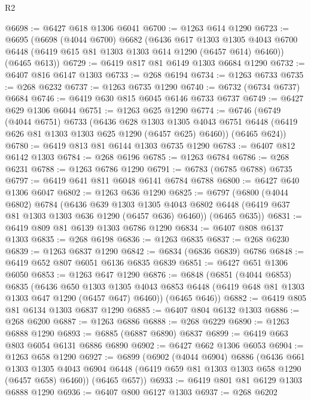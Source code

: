 \begin{lexlean}{R2}
\begin{coremodule}
@6698 := @6427 @618 @1306 @6041
@6700 := @1263 @614 @1290
@6723 := @6695
    (@6698
      (@4044 @6700)
      @6682
      (@6436
        @617
        @1303
        @1305
        @4043
        @6700
        @6448
        (@6419 @615 @81 @1303 @1303 @614 @1290 (@6457 @614) @6460))
      (@6465 @613))
@6729 := @6419 @817 @81 @6149 @1303 @6684 @1290
@6732 := @6407 @816 @6147 @1303
@6733 := @268 @6194
@6734 := @1263 @6733
@6735 := @268 @6232
@6737 := @1263 @6735 @1290
@6740 := @6732 (@6734 @6737) @6684
@6746 := @6419 @630 @815 @6045 @6146 @6733 @6737
@6749 := @6427 @629 @1306 @6044
@6751 := @1263 @625 @1290
@6774 := @6746
    (@6749
      (@4044 @6751)
      @6733
      (@6436
        @628
        @1303
        @1305
        @4043
        @6751
        @6448
        (@6419 @626 @81 @1303 @1303 @625 @1290 (@6457 @625) @6460))
      (@6465 @624))
@6780 := @6419 @813 @81 @6144 @1303 @6735 @1290
@6783 := @6407 @812 @6142 @1303
@6784 := @268 @6196
@6785 := @1263 @6784
@6786 := @268 @6231
@6788 := @1263 @6786 @1290
@6791 := @6783 (@6785 @6788) @6735
@6797 := @6419 @641 @811 @6048 @6141 @6784 @6788
@6800 := @6427 @640 @1306 @6047
@6802 := @1263 @636 @1290
@6825 := @6797
    (@6800
      (@4044 @6802)
      @6784
      (@6436
        @639
        @1303
        @1305
        @4043
        @6802
        @6448
        (@6419 @637 @81 @1303 @1303 @636 @1290 (@6457 @636) @6460))
      (@6465 @635))
@6831 := @6419 @809 @81 @6139 @1303 @6786 @1290
@6834 := @6407 @808 @6137 @1303
@6835 := @268 @6198
@6836 := @1263 @6835
@6837 := @268 @6230
@6839 := @1263 @6837 @1290
@6842 := @6834 (@6836 @6839) @6786
@6848 := @6419 @652 @807 @6051 @6136 @6835 @6839
@6851 := @6427 @651 @1306 @6050
@6853 := @1263 @647 @1290
@6876 := @6848
    (@6851
      (@4044 @6853)
      @6835
      (@6436
        @650
        @1303
        @1305
        @4043
        @6853
        @6448
        (@6419 @648 @81 @1303 @1303 @647 @1290 (@6457 @647) @6460))
      (@6465 @646))
@6882 := @6419 @805 @81 @6134 @1303 @6837 @1290
@6885 := @6407 @804 @6132 @1303
@6886 := @268 @6200
@6887 := @1263 @6886
@6888 := @268 @6229
@6890 := @1263 @6888 @1290
@6893 := @6885 (@6887 @6890) @6837
@6899 := @6419 @663 @803 @6054 @6131 @6886 @6890
@6902 := @6427 @662 @1306 @6053
@6904 := @1263 @658 @1290
@6927 := @6899
    (@6902
      (@4044 @6904)
      @6886
      (@6436
        @661
        @1303
        @1305
        @4043
        @6904
        @6448
        (@6419 @659 @81 @1303 @1303 @658 @1290 (@6457 @658) @6460))
      (@6465 @657))
@6933 := @6419 @801 @81 @6129 @1303 @6888 @1290
@6936 := @6407 @800 @6127 @1303
@6937 := @268 @6202

\end{coremodule}
\end{lexlean}

